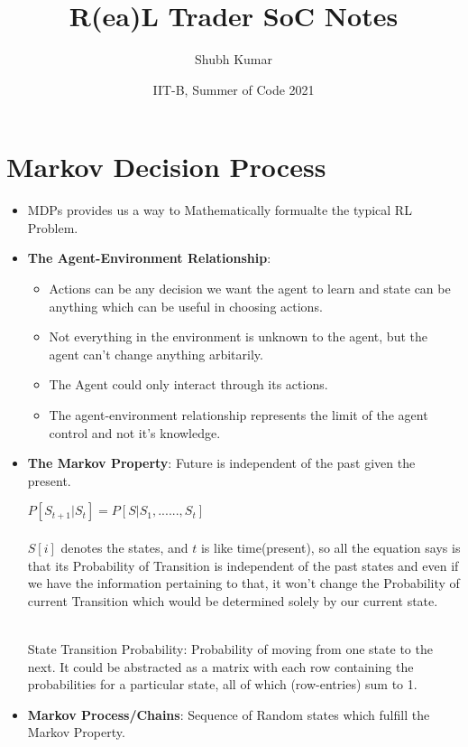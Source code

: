 \documentclass{article}
\title{R(ea)L Trader SoC Notes}
\author{Shubh Kumar}
\date{IIT-B, Summer of Code 2021}
\begin{document}
\maketitle

\section{Markov Decision Process}
\begin{itemize}
  \item MDPs provides us a way to Mathematically formualte the typical RL Problem.
  \item \textbf{The Agent-Environment Relationship}:
  \begin{itemize}
    \item Actions can be any decision we want the agent to learn and state can be anything which can be useful in choosing actions.
    \item Not everything in the environment is unknown to the agent, but the agent can't change anything arbitarily.
    \item The Agent could only interact through its actions.
    \item The agent-environment relationship represents the limit of the agent control and not it’s knowledge.
  \end{itemize}
  \item \textbf{The Markov Property}: Future is independent of the past given the present.      \\
  \begin{center}
    $P[S_{t+1} | S_{t}] = P[ S | S_{1}, ......, S_{t}]$  \\~\\
    $S[i]$ denotes the states, and $t$ is like time(present), so all the equation says is that its Probability of Transition is independent of the past states and even if we have the information pertaining to that, it won't change the Probability of current Transition which would be determined solely by our current state. \\~\\
  \end{center}

  State Transition Probability: Probability of moving from one state to the next. It could be abstracted as a matrix with each row containing the probabilities for a particular state, all of which (row-entries) sum to 1.

  \item \textbf{Markov Process/Chains}: Sequence of Random states which fulfill the Markov Property.


\end{itemize}
\end{document}
